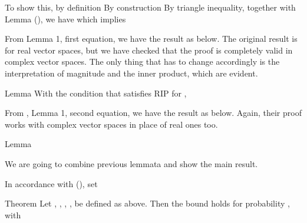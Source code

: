 To show this, by definition
By construction
By triangle inequality, together with Lemma (), we have
which implies

From  Lemma 1, first equation, we have the result as below.
The original result is for real vector spaces, but we have checked that the proof is completely valid in complex vector spaces.
The only thing that has to change accordingly is the interpretation of magnitude and the inner product, which are evident.

\Result
{Lemma}
{
With the condition that  satisfies RIP for ,
}

From , Lemma 1, second equation, we have the result as below.
Again, their proof works with complex vector spaces in place of real ones too.

\Result
{Lemma}
{
}

\stopsubsection

\startsubsection [title={Main Result}]

We are going to combine previous lemmata and show the main result.

In accordance with (), set

\Result
{Theorem}
{
Let , , , ,  be defined as above.
Then the bound
holds for probability , with
}


